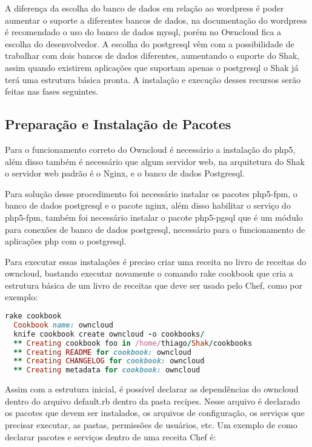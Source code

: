 A diferença da escolha do banco de dados em relação ao wordpress é poder aumentar
o suporte a diferentes bancos de dados, na documentação do wordpress é recomendado
o uso do banco de dados mysql, porém no Owncloud fica a escolha do desenvolvedor.
A escolha do postgresql vêm com a possibilidade de trabalhar com dois bancos de
dados diferentes, aumentando o suporte do Shak, assim quando existirem aplicações
que suportam apenas o postgresql o Shak já terá uma estrutura básica pronta.
A instalação e execução desses recursos serão feitas nas fases seguintes.

\subsection{Preparação e Instalação de Pacotes}

Para o funcionamento correto do Owncloud é necessário a instalação do php5, além
disso também é necessário que algum servidor web, na arquitetura do Shak o servidor
web padrão é o Nginx, e o banco de dados Postgresql.

Para solução desse procedimento foi necessário instalar os pacotes php5-fpm, o banco
de dados postgresql e o pacote nginx, além disso habilitar o serviço do php5-fpm,
também foi necessário instalar o pacote php5-pgsql que é um módulo para
conexões de banco de dados postgresql, necessário para o funcionamento de
aplicações php com o postgresql.

Para executar essas instalações é preciso criar uma receita no livro de receitas
do owncloud, bastando executar novamente o comando rake cookbook que cria a estrutura básica
de um livro de receitas que deve ser usado pelo Chef, como por exemplo:

\begin{lstlisting}[language=Ruby,label=dice_index,caption={Exemplo de criação de estrutura básica de livro de receitas do owncloud com shak}]
  rake cookbook
  Cookbook name: owncloud
  knife cookbook create owncloud -o cookbooks/
  ** Creating cookbook foo in /home/thiago/Shak/cookbooks
  ** Creating README for cookbook: owncloud
  ** Creating CHANGELOG for cookbook: owncloud
  ** Creating metadata for cookbook: owncloud
\end{lstlisting}

Assim com a estrutura inicial, é possível declarar as dependências do owncloud
dentro do arquivo default.rb dentro da pasta recipes. Nesse arquivo é 
declarado os pacotes que devem ser instalados, os arquivos de configuração,
os serviços que precisar executar, as pastas, permissões de usuários, etc. Um exemplo
de como declarar pacotes e serviços dentro de uma receita Chef é:

